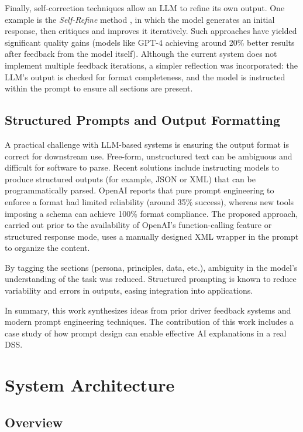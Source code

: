 \documentclass[12pt]{article}
\begin{document}
Finally, self-correction techniques allow an LLM to refine its own output. One example is the \textit{Self-Refine} method \cite{madaan2023}, in which the model generates an initial response, then critiques and improves it iteratively. Such approaches have yielded significant quality gains (models like GPT-4 \cite{openai2023} achieving around 20\% better results after feedback from the model itself). Although the current system does not implement multiple feedback iterations, a simpler reflection was incorporated: the LLM’s output is checked for format completeness, and the model is instructed within the prompt to ensure all sections are present.

\subsection{Structured Prompts and Output Formatting}

A practical challenge with LLM-based systems is ensuring the output format is correct for downstream use. Free-form, unstructured text can be ambiguous and difficult for software to parse. Recent solutions include instructing models to produce structured outputs (for example, JSON or XML) that can be programmatically parsed. OpenAI reports that pure prompt engineering to enforce a format had limited reliability (around 35\% success), whereas new tools imposing a schema can achieve 100\% format compliance. The proposed approach, carried out prior to the availability of OpenAI’s function-calling feature or structured response mode, uses a manually designed XML wrapper in the prompt to organize the content.

By tagging the sections (persona, principles, data, etc.), ambiguity in the model’s understanding of the task was reduced. Structured prompting is known to reduce variability and errors in outputs, easing integration into applications.

In summary, this work synthesizes ideas from prior driver feedback systems and modern prompt engineering techniques. The contribution of this work includes a case study of how prompt design can enable effective AI explanations in a real DSS.

\section{System Architecture}

\subsection{Overview}
\end{document}
